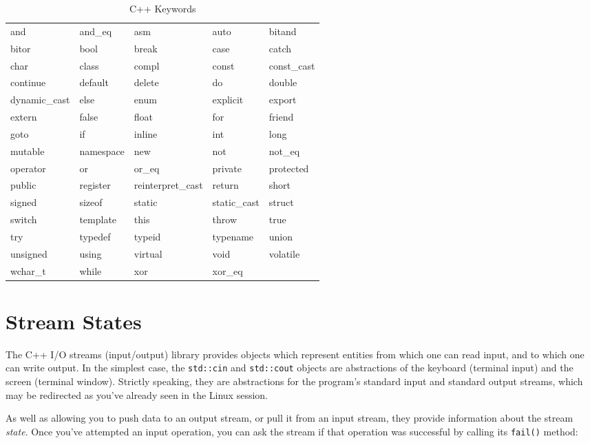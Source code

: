 \documentclass[a4paper]{scrartcl}
\begin{document}
\begin{table}[htb]
\centering
\begin{tabularx}{\textwidth}{XXXXX}
\toprule
and & and\_eq & asm & auto & bitand \\
bitor & bool & break & case & catch \\
char & class & compl & const & const\_cast \\
continue & default & delete & do & double \\
dynamic\_cast & else & enum & explicit & export \\
extern & false & float & for & friend \\
goto & if & inline & int & long \\
mutable & namespace & new & not & not\_eq \\
operator & or & or\_eq & private & protected \\
public & register & reinterpret\_cast & return & short \\
signed & sizeof & static & static\_cast & struct \\
switch & template & this & throw & true \\
try & typedef & typeid & typename & union \\
unsigned & using & virtual & void & volatile \\
wchar\_t & while & xor & xor\_eq & \\
\bottomrule
\end{tabularx}
\caption{\label{keywords}C++ Keywords}
\end{table}

\section{Stream States}
The C++ I/O streams (input/output) library\cite{IOStreams} provides objects which represent entities from which one can read input, and to which one can write output. In the simplest case, the \texttt{std::cin} and \texttt{std::cout} objects are abstractions of the keyboard (terminal input) and the screen (terminal window). Strictly speaking, they are abstractions for the program's standard input and standard output streams, which may be redirected as you've already seen in the Linux session.

As well as allowing you to push data to an output stream, or pull it from an input stream, they provide information about the stream \emph{state}. Once you've attempted an input operation, you can ask the stream if that operation was successful by calling its \texttt{fail()} method:
\end{document}
